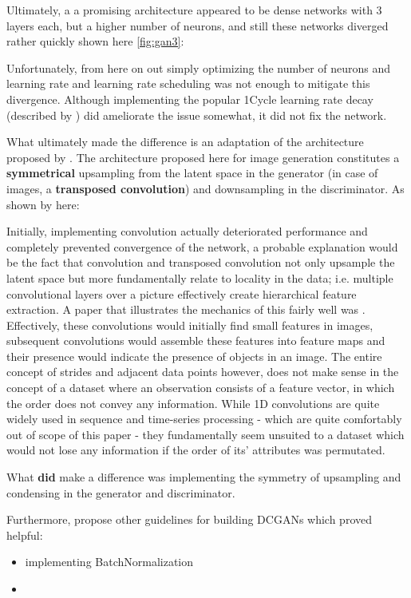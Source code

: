 Ultimately, a a promising architecture appeared to be dense networks with 3 layers each, but a higher number of neurons, and still these networks diverged rather quickly shown here \ref{fig:gan3}:
 

Unfortunately, from here on out simply optimizing the number of neurons and learning rate and learning rate scheduling was not enough to mitigate this divergence. Although implementing the popular 1Cycle learning rate decay (described by \cite{smith_1cycle}) did ameliorate the issue somewhat, it did not fix the network.

\pagebreak

What ultimately made the difference is an adaptation of the architecture proposed by \cite{dcgan}. The architecture proposed here for image generation constitutes a \textbf{symmetrical} upsampling from the latent space in the generator (in case of images, a \textbf{transposed convolution}) and downsampling in the discriminator. As shown by \cite{oversampling_gan} here:


Initially, implementing convolution actually deteriorated performance and completely prevented convergence of the network, a probable explanation would be the fact that convolution and transposed convolution not only upsample the latent space but more fundamentally relate to locality in the data; i.e. multiple convolutional layers over a picture effectively create hierarchical feature extraction. A paper that illustrates the mechanics of this fairly well was \cite{convolution_arithmetic}. Effectively, these convolutions would initially find small features in images, subsequent convolutions would assemble these features into feature maps and their presence would indicate the presence of objects in an image. The entire concept of strides and adjacent data points however, does not make sense in the concept of a dataset where an observation consists of a feature vector, in which the order does not convey any information. While 1D convolutions are quite widely used in sequence and time-series processing - which are quite comfortably out of scope of this paper - they fundamentally seem unsuited to a dataset which would not lose any information if the order of its' attributes was permutated.

What \textbf{did} make a difference was implementing the symmetry of upsampling and condensing in the generator and discriminator.

Furthermore, \cite{dcgan} propose other guidelines for building \acp{DCGAN} which proved helpful:

\begin{itemize}
	\item implementing BatchNormalization \cite{batchnorm}
	\item 
\end{itemize}

\pagebreak 
